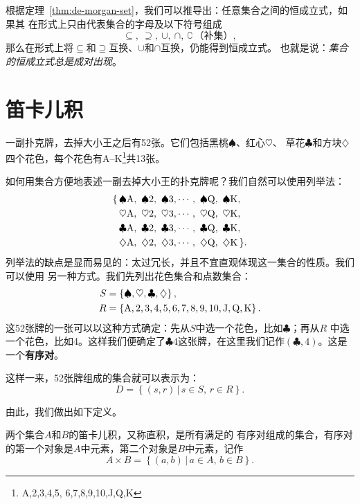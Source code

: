 根据定理~\ref{thm:de-morgan-set}，我们可以推导出：任意集合之间的恒成立式，如果其
在形式上只由代表集合的字母及以下符号组成
\[
    \subseteq,\ \supseteq,\ \cup,\ \cap,\ \complement\,\text{（补集）},
\]
那么在形式上将$\subseteq$和$\supseteq$互换、$\cup$和$\cap$互换，仍能得到恒成立式。
也就是说：\emph{集合的恒成立式总是成对出现}。

\section{笛卡儿积}

一副扑克牌，去掉大小王之后有52张。它们包括黑桃$\spadesuit$、红心$\heartsuit$、
草花$\clubsuit$和方块$\diamondsuit$四个花色，每个花色有A--K\footnote{A,2,3,4,5,%
6,7,8,9,10,J,Q,K}共13张。

如何用集合方便地表述一副去掉大小王的扑克牌呢？我们自然可以使用列举法：
\begin{align*}
    \{\, &\spadesuit \ace,\ \spadesuit 2,\ \spadesuit 3,\cdots,\ \spadesuit \queen,\ 
    \spadesuit \king, \\
       &\heartsuit \ace,\ \heartsuit 2,\ \heartsuit 3,\cdots,\ \heartsuit \queen,\ 
    \heartsuit \king, \\
       &\clubsuit \ace,\ \clubsuit 2,\ \clubsuit 3,\cdots,\ \clubsuit \queen,\ 
    \clubsuit \king, \\
       &\diamondsuit \ace,\ \diamondsuit 2,\ \diamondsuit 3,\cdots,\ \diamondsuit \queen,\ 
    \diamondsuit \king\, \}.
\end{align*}
列举法的缺点是显而易见的：太过冗长，并且不宜直观体现这一集合的性质。我们可以使用
另一种方式。我们先列出花色集合和点数集合：
\begin{align*}
    S &= \left\{ \spadesuit,\heartsuit,\clubsuit,\diamondsuit \right\},\\
    R &= \left\{ \text{A},2,3,4,5,6,7,8,9,10,\text{J},\text{Q},\text{K} \right\}.
\end{align*}
这52张牌的一张可以以这种方式确定：先从$S$中选一个花色，比如$\clubsuit$；再从$R$
中选一个花色，比如4。这样我们便确定了$\clubsuit 4$这张牌，在这里我们记作$\left( 
\clubsuit, 4\right) $。这是一个\textbf{有序对}\index{有序对}。

这样一来，52张牌组成的集合就可以表示为：
\[
    D = \left\{ \left( s,r \right) \,|\, s\in S,\, r\in R \right\}.
\]

由此，我们做出如下定义。

\begin{rawdef}[笛卡儿积]
    两个集合$A$和$B$的笛卡儿积，又称直积，是所有满足的
    有序对组成的集合，有序对的第一个对象是$A$中元素，第二个对象是$B$中元素，记作
    \[
        A \times B = \left\{ \left( a,b \right) \,|\, a\in A,\, b\in B \right\}.
    \]
\end{rawdef}

